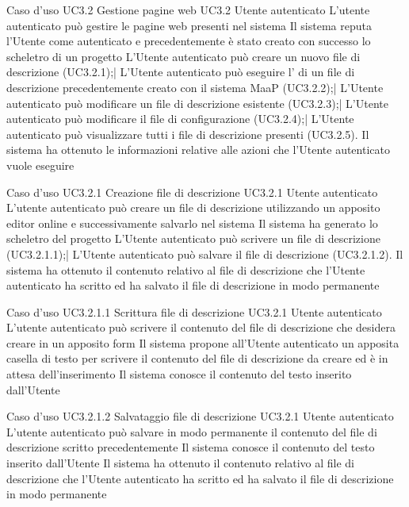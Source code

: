\UCtitle
{Caso d'uso UC3.2}
{Gestione pagine web}
\UC
{UC3.2}
{Utente autenticato}
{L'utente autenticato può gestire le pagine web presenti nel sistema}
{Il sistema reputa l'Utente come autenticato e precedentemente è stato creato con successo lo scheletro di un progetto}
\scenario
{L'Utente autenticato può creare un nuovo file di descrizione (UC3.2.1);|
L'Utente autenticato può eseguire l' di un file di descrizione precedentemente creato con il sistema MaaP (UC3.2.2);|
L'Utente autenticato può modificare un file di descrizione esistente (UC3.2.3);|
L'Utente autenticato può modificare il file di configurazione (UC3.2.4);|
L'Utente autenticato può visualizzare tutti i file di descrizione presenti (UC3.2.5).
}
\post
{Il sistema ha ottenuto le informazioni relative alle azioni che l'Utente autenticato vuole eseguire}


\UCtitle
{Caso d'uso UC3.2.1}
{Creazione file di descrizione}
\UC
{UC3.2.1}
{Utente autenticato}
{L'utente autenticato può creare un file di descrizione utilizzando un apposito editor online e successivamente salvarlo nel sistema}
{Il sistema ha generato lo scheletro del progetto}
\scenario
{L'Utente autenticato può scrivere un file di descrizione (UC3.2.1.1);|
L'Utente autenticato può salvare il file di descrizione (UC3.2.1.2).
}
\post
{Il sistema ha ottenuto il contenuto relativo al file di descrizione che l'Utente autenticato ha scritto ed ha salvato il file di descrizione in modo permanente}

\UCtitle
{Caso d'uso UC3.2.1.1}
{Scrittura file di descrizione}
\UC
{UC3.2.1}
{Utente autenticato}
{L'utente autenticato può scrivere il contenuto del file di descrizione che desidera creare in un apposito form}
{Il sistema propone all'Utente autenticato un apposita casella di testo per scrivere il contenuto del file di descrizione da creare ed è in attesa dell'inserimento}
\post
{Il sistema conosce il contenuto del testo inserito dall'Utente}

\UCtitle
{Caso d'uso UC3.2.1.2}
{Salvataggio file di descrizione}
\UC
{UC3.2.1}
{Utente autenticato}
{L'utente autenticato può salvare in modo permanente il contenuto del file di descrizione scritto precedentemente}
{Il sistema conosce il contenuto del testo inserito dall'Utente}
\post
{Il sistema ha ottenuto il contenuto relativo al file di descrizione che l'Utente autenticato ha scritto ed ha salvato il file di descrizione in modo permanente}

